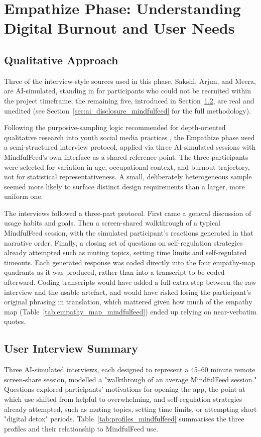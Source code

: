 \documentclass[11pt]{article}
\begin{document}
\section{Empathize Phase: Understanding Digital Burnout and User Needs}

\subsection{Qualitative Approach}
Three of the interview-style sources used in this phase, Sakshi, Arjun, and Meera, are AI-simulated, standing in for participants who could not be recruited within the project timeframe; the remaining five, introduced in Section~\ref{sec:mindfulfeed_interviews}, are real and unedited (see Section~\ref{sec:ai_disclosure_mindfulfeed} for the full methodology).

Following the purposive-sampling logic recommended for depth-oriented qualitative research into youth social media practices \parencites[5]{7173856}, the Empathize phase used a semi-structured interview protocol, applied via three AI-simulated sessions with MindfulFeed's own interface as a shared reference point. The three participants were selected for variation in age, occupational context, and burnout trajectory, not for statistical representativeness. A small, deliberately heterogeneous sample seemed more likely to surface distinct design requirements than a larger, more uniform one.

The interviews followed a three-part protocol. First came a general discussion of usage habits and goals. Then a screen-shared walkthrough of a typical MindfulFeed session, with the simulated participant's reactions generated in that narrative order. Finally, a closing set of questions on self-regulation strategies already attempted such as muting topics, setting time limits and self-regulated timeouts. Each generated response was coded directly into the four empathy-map quadrants as it was produced, rather than into a transcript to be coded afterward. Coding transcripts would have added a full extra step between the raw interview and the usable artefact, and would have risked losing the participant's original phrasing in translation, which mattered given how much of the empathy map (Table~\ref{tab:empathy_map_mindfulfeed}) ended up relying on near-verbatim quotes.

\subsection{User Interview Summary}
\label{sec:mindfulfeed_interviews}
Three AI-simulated interviews, each designed to represent a 45--60 minute remote screen-share session, modelled a "walkthrough of an average MindfulFeed session." Questions explored participants' motivations for opening the app, the point at which use shifted from helpful to overwhelming, and self-regulation strategies already attempted, such as muting topics, setting time limits, or attempting short "digital detox" periods. Table~\ref{tab:profiles_mindfulfeed} summarises the three profiles and their relationship to MindfulFeed use.
\end{document}
